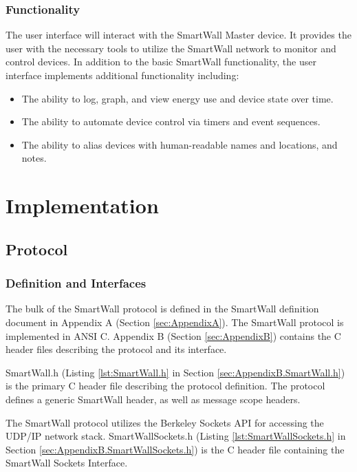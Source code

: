 \documentclass[12pt]{article}
\begin{document}
\subsubsection{Functionality}
The user interface will interact with the SmartWall Master device. It
provides the user with the necessary tools to utilize the SmartWall
network to monitor and control devices. In addition to the basic
SmartWall functionality, the user interface implements additional
functionality including:
\begin{itemize}
  \setlength{\itemsep}{0pt}
  \setlength{\parskip}{0pt}
  \setlength{\parsep}{0pt}
\item The ability to log, graph, and view energy use and device state
  over time.
\item The ability to automate device control via timers and event
  sequences.
\item The ability to alias devices with human-readable names and
  locations, and notes.
\end{itemize}  

\section{Implementation}
\subsection{Protocol}
\subsubsection{Definition and Interfaces}

The bulk of the SmartWall protocol is defined in the SmartWall
definition document in Appendix A (Section \ref{sec:AppendixA}). The
SmartWall protocol is implemented in ANSI C. Appendix B (Section
\ref{sec:AppendixB}) contains the C header files describing the protocol
and its interface.

SmartWall.h (Listing
\ref{lst:SmartWall.h} in Section \ref{sec:AppendixB.SmartWall.h}) is
the primary C header file describing the protocol definition. The
protocol defines a generic SmartWall header, as well as message scope
headers.

The SmartWall protocol utilizes the Berkeley Sockets API for accessing
the UDP/IP network stack. SmartWallSockets.h (Listing
\ref{lst:SmartWallSockets.h} in Section
\ref{sec:AppendixB.SmartWallSockets.h}) is the C header file containing
the SmartWall Sockets Interface.
\end{document}
